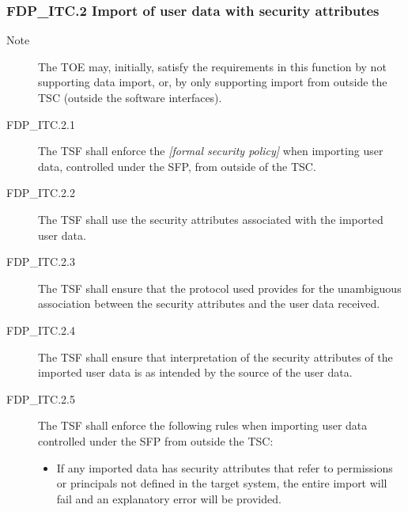 \documentclass[10pt,a4paper,english]{article}
\begin{document}

\hypertarget{fdp-itc-2-import-of-user-data-with-security-attributes}{}
\subsubsection*{FDP{\_}ITC.2 Import of user data with security attributes}
\begin{description}
\item[Note]

The TOE may, initially, satisfy the requirements in this
function by not supporting data import, or, by only
supporting import from outside the TSC (outside the
software interfaces).

\item[FDP{\_}ITC.2.1]

The TSF shall enforce the \emph{{[}formal security policy]} when importing user 
data, controlled under the SFP, from outside of the TSC.

\item[FDP{\_}ITC.2.2 ]

The TSF shall use the security attributes associated with the imported 
user data.

\item[FDP{\_}ITC.2.3]

The TSF shall ensure that the protocol used provides for the unambiguous 
association between the security attributes and the user data received.

\item[FDP{\_}ITC.2.4]

The TSF shall ensure that interpretation of the security attributes of 
the imported user data is as intended by the source of the user data.

\item[FDP{\_}ITC.2.5]

The TSF shall enforce the following rules when importing user data 
controlled under the SFP from outside the TSC:
\begin{itemize}
\item {} 
If any imported data has security attributes that refer to
permissions or principals not defined in the target system, the
entire import will fail and an explanatory error will be provided.

\end{itemize}

\end{description}
\end{document}
